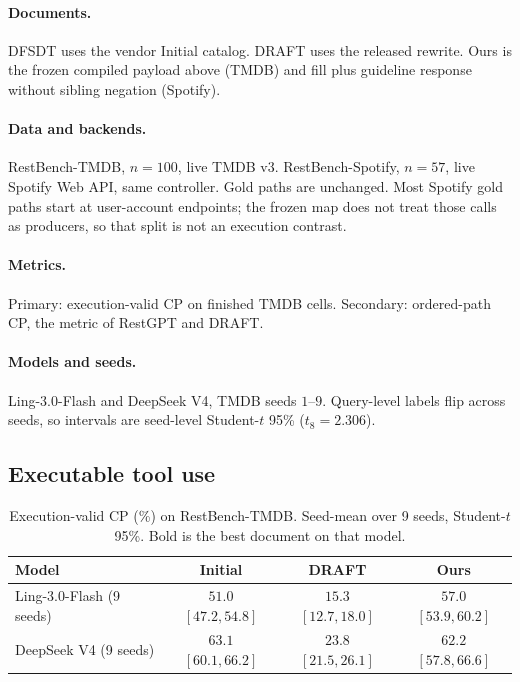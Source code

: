 \documentclass[11pt,a4paper]{article}
\begin{document}
\paragraph{Documents.}
DFSDT uses the vendor Initial catalog. DRAFT uses the released rewrite. Ours is the frozen compiled payload above (TMDB) and fill plus guideline response without sibling negation (Spotify).

\paragraph{Data and backends.}
RestBench-TMDB, $n{=}100$, live TMDB v3. RestBench-Spotify, $n{=}57$, live Spotify Web API, same controller. Gold paths are unchanged. Most Spotify gold paths start at user-account endpoints; the frozen map does not treat those calls as producers, so that split is not an execution contrast.

\paragraph{Metrics.}
Primary: execution-valid CP on finished TMDB cells. Secondary: ordered-path CP, the metric of RestGPT and DRAFT.

\paragraph{Models and seeds.}
Ling-3.0-Flash and DeepSeek V4, TMDB seeds $1$--$9$. Query-level labels flip across seeds, so intervals are seed-level Student-$t$ 95\% ($t_{8}{=}2.306$).

\subsection{Executable tool use}

\begin{table}[t]
\centering
\caption{Execution-valid CP (\%) on RestBench-TMDB. Seed-mean over 9 seeds, Student-$t$ 95\%. Bold is the best document on that model.}
\label{tab:exec}
\small
\begin{tabular}{lccc}
\toprule
Model & Initial & DRAFT & Ours \\
\midrule
Ling-3.0-Flash (9 seeds) & $51.0$ $[47.2,54.8]$ & $15.3$ $[12.7,18.0]$ & $\mathbf{57.0}$ $[53.9,60.2]$ \\
DeepSeek V4 (9 seeds) & $\mathbf{63.1}$ $[60.1,66.2]$ & $23.8$ $[21.5,26.1]$ & $62.2$ $[57.8,66.6]$ \\
\bottomrule
\end{tabular}
\end{table}
\end{document}
